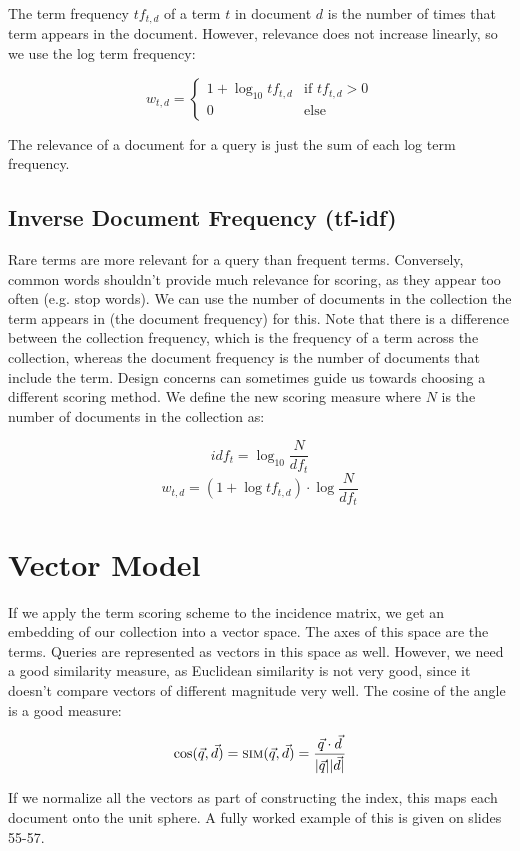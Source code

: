 \documentclass{idc_msc}
\begin{document}
The term frequency \(tf_{t,d}\) of a term \(t\) in document \(d\) is the number of times that term appears in the document.
However, relevance does not increase linearly, so we use the log term frequency:

\[
w_{t,d} = \begin{cases}
1 + \log_{10} tf_{t,d} & \text{if } tf_{t,d} > 0 \\
0 & \text{else}
\end{cases}
\]

The relevance of a document for a query is just the sum of each log term frequency.

\subsection{Inverse Document Frequency (tf-idf)}

Rare terms are more relevant for a query than frequent terms.
Conversely, common words shouldn't provide much relevance for scoring, as they appear too often (e.g. stop words).
We can use the number of documents in the collection the term appears in (the document frequency) for this.
Note that there is a difference between the collection frequency, which is the frequency of a term across the collection, whereas the document frequency is the number of documents that include the term.
Design concerns can sometimes guide us towards choosing a different scoring method.
We define the new scoring measure where \(N\) is the number of documents in the collection as:

\[
  idf_t = \log_{10} \frac{N}{df_t}
\]
\[
  w_{t,d} = (1 + \log tf_{t,d}) \cdot \log \frac{N}{df_t}
\]

\section{Vector Model}

If we apply the term scoring scheme to the incidence matrix, we get an embedding of our collection into a vector space.
The axes of this space are the terms.
Queries are represented as vectors in this space as well.
However, we need a good similarity measure, as Euclidean similarity is not very good, since it doesn't compare vectors of different magnitude very well.
The cosine of the angle is a good measure:

\[
\cos(\vec{q}, \vec{d}) =
\textsc{sim}(\vec{q},\vec{d}) =
\frac{\vec{q} \cdot \vec{d}}{|\vec{q}||\vec{d}|}
\]

If we normalize all the vectors as part of constructing the index, this maps each document onto the unit sphere.
A fully worked example of this is given on slides 55-57.
\end{document}
